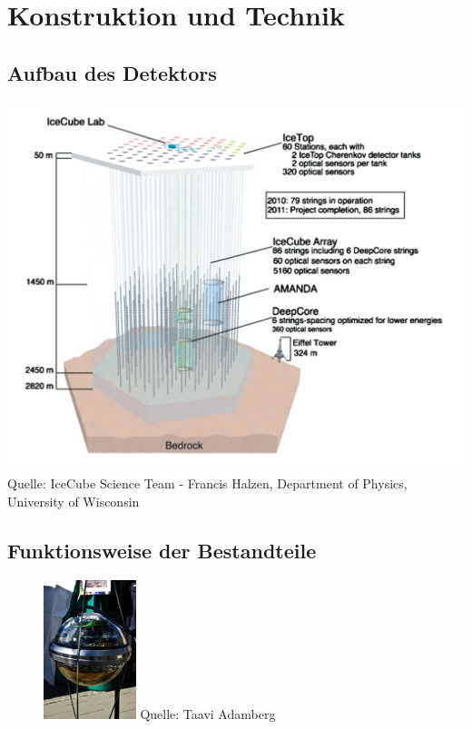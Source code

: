     \newpage
    
    \section{Konstruktion und Technik}

    \subsection{Aufbau des Detektors}

    \begin{center}
        \includegraphics[scale=0.42]{images/architeture.png} \\
        Quelle: IceCube Science Team - Francis Halzen, Department of Physics, University of Wisconsin      
    \end{center}

    \newpage

    \subsection{Funktionsweise der Bestandteile}

    \begin{figure}
        \includegraphics[width=0.24\textwidth]{images/pmt.jpg}
        Quelle: Taavi Adamberg
    \end{figure}  

